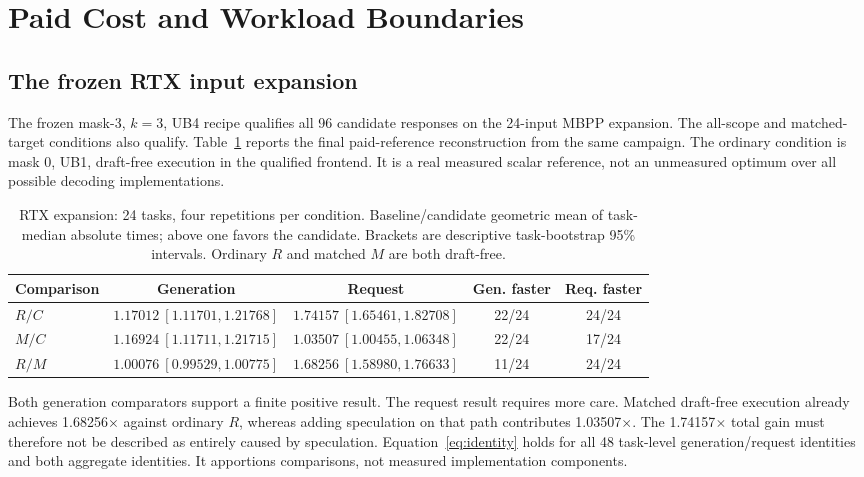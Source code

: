 \section{Paid Cost and Workload Boundaries}
\label{sec:cost}
\subsection{The frozen RTX input expansion}

The frozen mask-3, $k=3$, UB4 recipe qualifies all 96 candidate responses on the 24-input MBPP expansion. The all-scope and matched-target conditions also qualify. Table~\ref{tab:cost} reports the final paid-reference reconstruction from the same campaign. The ordinary condition is mask 0, UB1, draft-free execution in the qualified frontend. It is a real measured scalar reference, not an unmeasured optimum over all possible decoding implementations.

\begin{table}[t]
\centering\footnotesize\setlength{\tabcolsep}{1pt}
\caption{RTX expansion: 24 tasks, four repetitions per condition. Baseline/candidate geometric mean of task-median absolute times; above one favors the candidate. Brackets are descriptive task-bootstrap 95\% intervals. Ordinary $R$ and matched $M$ are both draft-free.}
\label{tab:cost}
\begin{tabular}{lcccc}\toprule
Comparison & Generation & Request & Gen. faster & Req. faster\\\midrule
$R/C$ & $1.17012\ [1.11701,1.21768]$ & $1.74157\ [1.65461,1.82708]$ & 22/24 & 24/24\\
$M/C$ & $1.16924\ [1.11711,1.21715]$ & $1.03507\ [1.00455,1.06348]$ & 22/24 & 17/24\\
$R/M$ & $1.00076\ [0.99529,1.00775]$ & $1.68256\ [1.58980,1.76633]$ & 11/24 & 24/24\\\bottomrule
\end{tabular}
\end{table}

Both generation comparators support a finite positive result. The request result requires more care. Matched draft-free execution already achieves 1.68256$\times$ against ordinary $R$, whereas adding speculation on that path contributes 1.03507$\times$. The 1.74157$\times$ total gain must therefore not be described as entirely caused by speculation. Equation~\ref{eq:identity} holds for all 48 task-level generation/request identities and both aggregate identities. It apportions comparisons, not measured implementation components.

